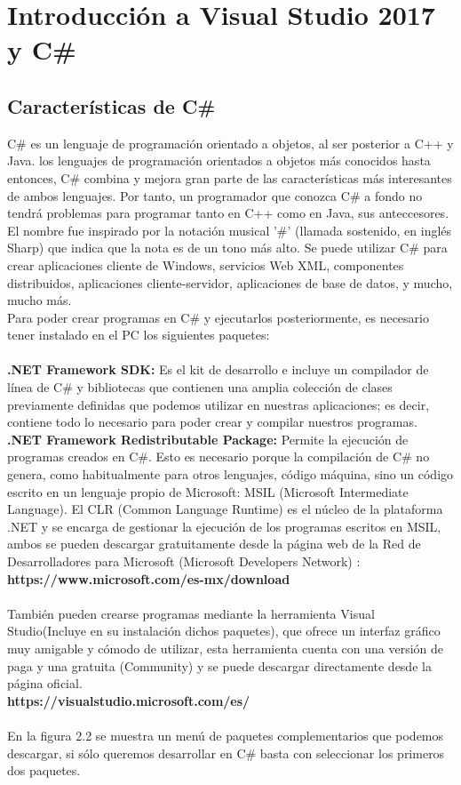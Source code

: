 \documentclass[12pt,a4paper]{report}
\begin{document}
\chapter{Introducción a Visual Studio 2017 y C\# }
\section{Características de C\#}
C\# es un lenguaje de programación orientado a objetos, al ser posterior a C++ y Java. los lenguajes de programación orientados a objetos más conocidos hasta entonces, C\# combina y mejora gran parte de las características más interesantes de ambos lenguajes. Por tanto, un programador que conozca C\# a fondo no tendrá problemas para programar tanto en C++ como en Java, sus anteccesores.\\El nombre fue inspirado por la notación musical '\#' (llamada sostenido, en inglés Sharp) que indica que la nota es de un tono más alto. Se puede utilizar C\# para crear aplicaciones cliente de Windows, servicios Web XML, componentes distribuidos, aplicaciones cliente-servidor, aplicaciones de base de datos, y mucho, mucho más.\\Para poder crear programas en C\# y ejecutarlos posteriormente, es necesario tener instalado en el PC los siguientes paquetes:\\\\\textbf{.NET Framework SDK:} Es el kit de desarrollo e incluye un compilador de línea de C\# y bibliotecas que contienen una amplia colección de clases previamente definidas que podemos utilizar en nuestras aplicaciones; es decir, contiene todo lo necesario para poder crear y compilar nuestros programas.\\\textbf{.NET Framework Redistributable Package: } Permite la ejecución de programas creados en C\#. Esto es necesario porque la compilación de C\# no genera, como habitualmente para otros lenguajes, código máquina, sino un código escrito en un lenguaje propio de Microsoft: MSIL (Microsoft Intermediate Language). El CLR (Common Language Runtime) es el núcleo de la plataforma .NET y se encarga de gestionar la ejecución de los programas escritos en MSIL, ambos se pueden descargar gratuitamente desde la página web de la Red de Desarrolladores para Microsoft (Microsoft Developers Network) :\\ \textbf{https://www.microsoft.com/es-mx/download}\\\\También pueden crearse programas mediante la herramienta Visual Studio(Incluye en su instalación dichos paquetes), que ofrece un interfaz gráfico muy amigable y cómodo de utilizar, esta herramienta cuenta con una versión de paga y una gratuita (Community) y se puede descargar directamente desde la página oficial.\\\textbf{https://visualstudio.microsoft.com/es/}\\\\En la figura 2.2 se muestra un menú de paquetes complementarios que podemos descargar, si sólo queremos desarrollar en C\# basta con seleccionar los primeros dos paquetes.
\end{document}

